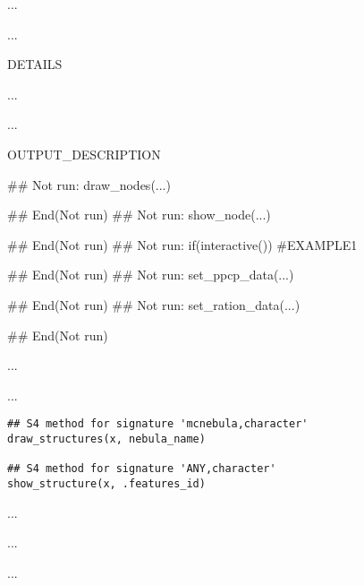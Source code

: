 \documentclass[letterpaper]{book}
\begin{document}
%
\begin{Details}\relax
...

...

DETAILS
\end{Details}
%
\begin{Value}
...

...

OUTPUT\_DESCRIPTION
\end{Value}
%
\begin{SeeAlso}\relax
{}

\end{SeeAlso}
%
\begin{Examples}
\begin{ExampleCode}
## Not run: 
draw_nodes(...)

## End(Not run)
## Not run: 
show_node(...)

## End(Not run)
## Not run: 
if(interactive()){
 #EXAMPLE1
 }

## End(Not run)
## Not run: 
set_ppcp_data(...)

## End(Not run)
## Not run: 
set_ration_data(...)

## End(Not run)
\end{ExampleCode}
\end{Examples}
%
\begin{Description}\relax
...

...
\end{Description}
%
\begin{Usage}
\begin{verbatim}
## S4 method for signature 'mcnebula,character'
draw_structures(x, nebula_name)

## S4 method for signature 'ANY,character'
show_structure(x, .features_id)
\end{verbatim}
\end{Usage}
%
\begin{Arguments}
\begin{ldescription}
\item[\code{x}] ...

\item[\code{nebula\_name}] ...

\item[\code{.features\_id}] ...
\end{ldescription}
\end{Arguments}
\end{document}

